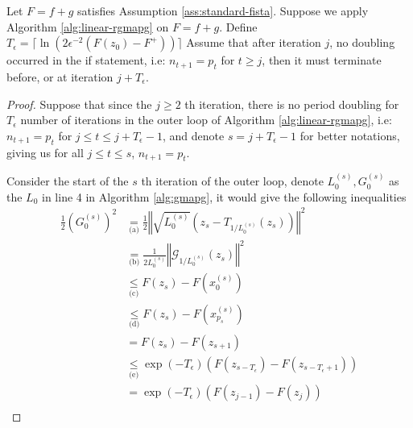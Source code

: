 \documentclass[12pt]{report}
\begin{document}
        \begin{lemma}\label{lemma:rgmapg-outer-itr-bnd}
            Let $F = f + g$ satisfies Assumption \ref{ass:standard-fista}. 
            Suppose we apply Algorithm \ref{alg:linear-rgmapg} on $F = f + g$. 
            Define $T_\epsilon = \lceil\ln(2\epsilon^{-2}(F(z_0) - F^+))\rceil$
            Assume that after iteration $j$, no doubling occurred in the if statement, i.e: $n_{t + 1} = p_t$ for $t \ge j$, then it must terminate before, or at iteration $j + T_\epsilon$. 
        \end{lemma}
        \begin{proof}
            Suppose that since the $j\ge 2$ th iteration, there is no period doubling for $T_\epsilon$ number of iterations in the outer loop of Algorithm \ref{alg:linear-rgmapg}, i.e: $n_{t + 1} = p_t$
            for $j \le t \le j + T_\epsilon - 1$, and denote $s = j + T_\epsilon -1$ for better notations, giving us for all $j \le t \le s$, $n_{t + 1} = p_t$. 
            \par
            Consider the start of the $s$ th iteration of the outer loop, denote $L_0^{(s)}, G_0^{(s)}$ as the $L_0$ in line 4 in Algorithm \ref{alg:gmapg}, it would give the following inequalities
            {\allowdisplaybreaks
            \begin{align*}
                \frac{1}{2}\left(
                    G_0^{(s)}
                \right)^2
                &\underset{\text{(a)}}{=} 
                \frac{1}{2}\left\Vert
                    \sqrt{L_0^{(s)}}\left(z_s - T_{1/L_0^{(s)}}(z_s)\right)
                \right\Vert^2
                \\
                &\underset{\text{(b)}}{=} \frac{1}{2L_0^{(s)}}\left\Vert
                        \mathcal G_{1/L_0^{(s)}}(z_s)
                \right\Vert^2
                \\
                &\underset{\text{(c)}}{\le} F(z_s) - F\left(x_0^{(s)}\right) 
                \\
                &\underset{\text{(d)}}{\le} 
                F(z_s) - F\left(x_{p_s}^{(s)}\right)
                \\
                &= F(z_s) - F(z_{s + 1})
                \\
                &\underset{\text{(e)}}{\le} \exp(-T_\epsilon)\left(F(z_{s - T_\epsilon}) - F(z_{s - T_\epsilon + 1})\right)
                \\
                &= \exp(-T_\epsilon)(F(z_{j - 1}) - F(z_j)) 
                \\

\end{align*}}
\end{proof}
\end{document}
